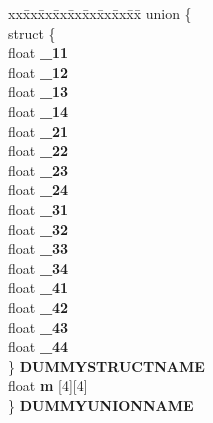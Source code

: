 \begin{DoxyCompactItemize}
\begin{tabbing}
\end{tabbing}\item 
\mbox{\label{struct___d3_d_m_a_t_r_i_x_a841943760e2a28b1bb1b7b1e8894775a}} 
\begin{tabbing}
xx\=xx\=xx\=xx\=xx\=xx\=xx\=xx\=xx\=\kill
union \{\\
\>struct \{\\
\>\>float {\bfseries \_11}\\
\>\>float {\bfseries \_12}\\
\>\>float {\bfseries \_13}\\
\>\>float {\bfseries \_14}\\
\>\>float {\bfseries \_21}\\
\>\>float {\bfseries \_22}\\
\>\>float {\bfseries \_23}\\
\>\>float {\bfseries \_24}\\
\>\>float {\bfseries \_31}\\
\>\>float {\bfseries \_32}\\
\>\>float {\bfseries \_33}\\
\>\>float {\bfseries \_34}\\
\>\>float {\bfseries \_41}\\
\>\>float {\bfseries \_42}\\
\>\>float {\bfseries \_43}\\
\>\>float {\bfseries \_44}\\
\>\} {\bfseries DUMMYSTRUCTNAME}\\
\>float {\bfseries m} \mbox{[}4\mbox{]}\mbox{[}4\mbox{]}\\
\} {\bfseries DUMMYUNIONNAME}\\


\end{tabbing}
\end{DoxyCompactItemize}
